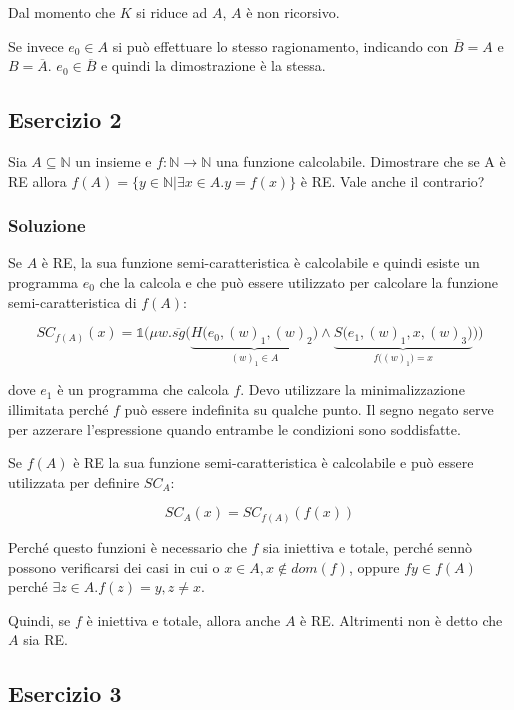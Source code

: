 Dal momento che $K$ si riduce ad $A$, $A$ è non ricorsivo.

Se invece $e_0\in A$ si può effettuare lo stesso ragionamento, indicando con $\overline{B} = A$ e $B = \overline{A}$. $e_0 \in \overline{B}$ e quindi la dimostrazione è la stessa.

\subsection{Esercizio 2}

Sia $A \subseteq \mathbb{N}$ un insieme e $f : \mathbb{N} \rightarrow \mathbb{N}$ una funzione calcolabile. Dimostrare che se A è RE allora $f(A) = \{ y \in \mathbb{N} | \exists x \in A . y = f(x) \}$ è RE. Vale anche il contrario?


\subsubsection{Soluzione}

Se $A$ è RE, la sua funzione semi-caratteristica è calcolabile e quindi esiste un programma $e_0$ che la calcola e che può essere utilizzato per calcolare la funzione semi-caratteristica di $f(A)$:

$$
SC_{f(A)}(x) = \mathbb{1}\Bigg( \mu w. \overline{sg}\bigg(\underbrace{H\Big(e_0, (w)_1, (w)_2\Big)}_{(w)_1 \in A} \wedge \underbrace{S\Big(e_1, (w)_1, x, (w)_3 \Big)}_{f\big((w)_1\big) = x}\bigg) \Bigg)
$$

dove $e_1$ è un programma che calcola $f$.
Devo utilizzare la minimalizzazione illimitata perché $f$ può essere indefinita su qualche punto. Il segno negato serve per azzerare l'espressione quando entrambe le condizioni sono soddisfatte.

Se $f(A)$ è RE la sua funzione semi-caratteristica è calcolabile e può essere utilizzata per definire $SC_A$:

$$
SC_A(x) = SC_{f(A)}(f(x))
$$

Perché questo funzioni è necessario che $f$ sia iniettiva e totale, perché sennò possono verificarsi dei casi in cui o $x \in A, x \notin dom(f)$, oppure $fy \in f(A)$ perché $\exists z \in A. f(z) = y, z \neq x$.  

Quindi, se $f$ è iniettiva e totale, allora anche $A$ è RE. Altrimenti non è detto che $A$ sia RE.


\subsection{Esercizio 3}

